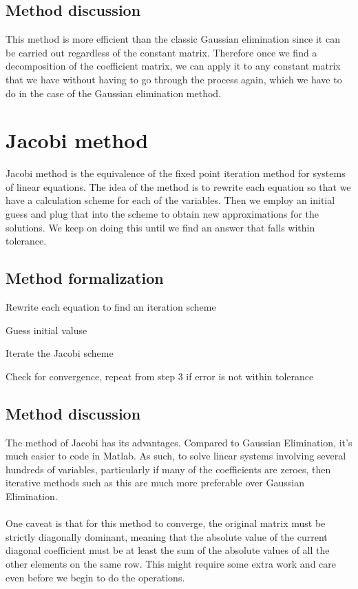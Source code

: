 \documentclass[openany]{book}
\begin{document}
      \subsection{Method discussion}
      This method is more efficient than the classic Gaussian elimination since it can be carried out regardless of the constant matrix. Therefore once we find a decomposition of the coefficient matrix, we can apply it to any constant matrix that we have without having to go through the process again, which we have to do in the case of the Gaussian elimination method.
    \section{Jacobi method}
    Jacobi method is the equivalence of the fixed point iteration method for systems of linear equations. The idea of the method is to rewrite each equation so that we have a calculation scheme for each of the variables. Then we employ an initial guess and plug that into the scheme to obtain new approximations for the solutions. We keep on doing this until we find an answer that falls within tolerance.
    \subsection{Method formalization}
      \begin{steps}
          \item Rewrite each equation to find an iteration scheme
          \item Guess initial valuse
          \item Iterate the Jacobi scheme
          \item Check for convergence, repeat from step 3 if error is not within tolerance
      \end{steps}
    \subsection{Method discussion}
    The method of Jacobi has its advantages. Compared to Gaussian Elimination, it's much easier to code in Matlab.  As such, to solve linear systems involving several hundreds of variables, particularly if many of the coefficients are zeroes, then iterative methods such as this are much more preferable over Gaussian Elimination.\\\\
    One caveat is that for this method to converge, the original matrix must be strictly diagonally dominant, meaning that the absolute value of the current diagonal coefficient must be at least the sum of the absolute values of all the other elements on the same row. This might require some extra work and care even before we begin to do the operations.
\end{document}

